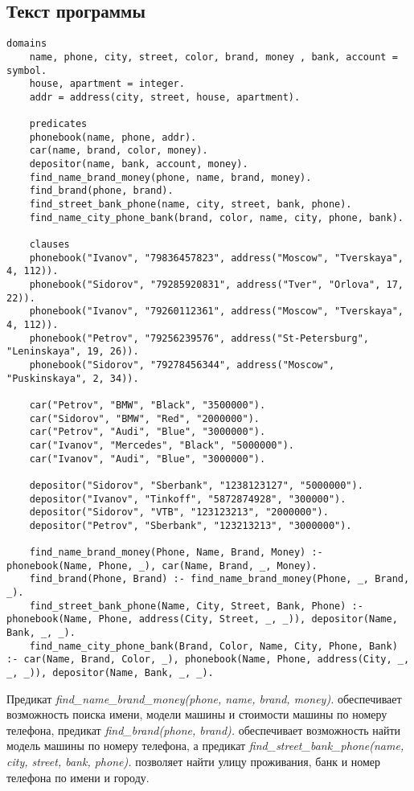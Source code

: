 \documentclass[a4paper,12pt]{article}
\begin{document}
	\newpage
	
	\subsection*{Текст программы}
	\begin{lstlisting}[caption=База знаний]
	domains 
	name, phone, city, street, color, brand, money , bank, account = symbol. 
	house, apartment = integer. 
	addr = address(city, street, house, apartment). 
	
	predicates 
	phonebook(name, phone, addr). 
	car(name, brand, color, money). 
	depositor(name, bank, account, money). 
	find_name_brand_money(phone, name, brand, money). 
	find_brand(phone, brand). 
	find_street_bank_phone(name, city, street, bank, phone). 
	find_name_city_phone_bank(brand, color, name, city, phone, bank). 
	
	clauses 
	phonebook("Ivanov", "79836457823", address("Moscow", "Tverskaya", 4, 112)). 
	phonebook("Sidorov", "79285920831", address("Tver", "Orlova", 17, 22)). 
	phonebook("Ivanov", "79260112361", address("Moscow", "Tverskaya", 4, 112)). 
	phonebook("Petrov", "79256239576", address("St-Petersburg", "Leninskaya", 19, 26)). 
	phonebook("Sidorov", "79278456344", address("Moscow", "Puskinskaya", 2, 34)). 
	
	car("Petrov", "BMW", "Black", "3500000"). 
	car("Sidorov", "BMW", "Red", "2000000"). 
	car("Petrov", "Audi", "Blue", "3000000"). 
	car("Ivanov", "Mercedes", "Black", "5000000"). 
	car("Ivanov", "Audi", "Blue", "3000000"). 
	
	depositor("Sidorov", "Sberbank", "1238123127", "5000000"). 
	depositor("Ivanov", "Tinkoff", "5872874928", "300000"). 
	depositor("Sidorov", "VTB", "123123213", "2000000"). 
	depositor("Petrov", "Sberbank", "123213213", "3000000"). 
	
	find_name_brand_money(Phone, Name, Brand, Money) :- phonebook(Name, Phone, _), car(Name, Brand, _, Money). 
	find_brand(Phone, Brand) :- find_name_brand_money(Phone, _, Brand, _). 
	find_street_bank_phone(Name, City, Street, Bank, Phone) :- phonebook(Name, Phone, address(City, Street, _, _)), depositor(Name, Bank, _, _). 
	find_name_city_phone_bank(Brand, Color, Name, City, Phone, Bank) :- car(Name, Brand, Color, _), phonebook(Name, Phone, address(City, _, _, _)), depositor(Name, Bank, _, _).
	\end{lstlisting}
	Предикат \emph{find\_name\_brand\_money(phone, name, brand, money).} обеспечивает возможность поиска имени, модели машины и стоимости машины по номеру телефона, предикат \emph{find\_brand(phone, brand).} обеспечивает возможность найти модель машины по номеру телефона, а предикат \emph{find\_street\_bank\_phone(name, city, street, bank, phone).} позволяет найти улицу проживания, банк и номер телефона по имени и городу.
	
\end{document}
